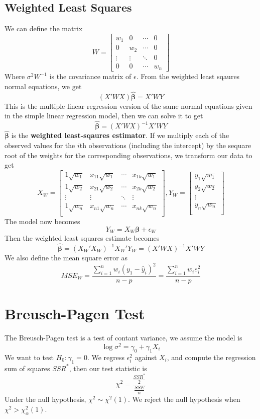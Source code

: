 \subsection{Weighted Least Squares}
We can define the matrix 
\[W = \begin{bmatrix}
    w_1 & 0 & \cdots & 0 \\
    0 & w_2 & \cdots & 0\\
    \vdots & \vdots & \ddots & 0\\
    0 & 0 & \cdots & w_n
\end{bmatrix}\]
Where $\sigma^2W^{-1}$ is the covariance matrix of $\epsilon$. From the weighted least sqaures normal equations, we get 
\[(X'WX)\boldsymbol{\hat{\beta}} = X'WY\]
This is the multiple linear regression version of the same normal equations given in the simple linear regression model, then we can solve it to get 
\[\boldsymbol{\hat{\beta}} = (X'WX)^{-1}X'WY\]
$\boldsymbol{\hat{\beta}}$ is the \textbf{weighted least-sqaures estimator}. If we multiply each of the observed values for the $i$th observations (including the intercept) by the sequare root of the weights for the corresponding observations, we transform our data to get
\renewcommand{\arraystretch}{1.5}
\[X_W = \begin{bmatrix}
    1\sqrt{w_1} & x_{11}\sqrt{w_1} & \cdots & x_{1k}\sqrt{w_1}\\
    1\sqrt{w_2} & x_{21}\sqrt{w_2} & \cdots & x_{2k}\sqrt{w_2}\\
    \vdots & \vdots & \ddots & \vdots\\
    1\sqrt{w_n} & x_{n1}\sqrt{w_n} & \cdots & x_{nk}\sqrt{w_n}\\
\end{bmatrix}, Y_W = \begin{bmatrix}
    y_1\sqrt{w_1}\\
    y_2\sqrt{w_2}\\
    \vdots\\
    y_n\sqrt{w_n}\\
\end{bmatrix}\]
The model now becomes 
\[Y_W = X_W\boldsymbol{\beta} + \epsilon_W\]
Then the weighted least squares estimate becomes 
\[\boldsymbol{\hat{\beta}} = (X_W'X_W)^{-1}X_W'Y_W = (X'WX)^{-1}X'WY\]
We also define the mean square error as 
\[MSE_W = \frac{\sum_{i=1}^n w_i(y_1 - \hat{y}_i)^2}{n-p} = \frac{\sum_{i=1}^nw_ie_i^2}{n-p}\]

\section{Breusch-Pagen Test}

The Breusch-Pagen test is a test of contant variance, we assume the model is 
\[\log \sigma^2 = \gamma_0 + \gamma_1X_i\]
We want to test $H_0: \gamma_1 = 0$. We regress $\epsilon_i^2$ against $X_i$, and compute the regression sum of squares $SSR^*$, then our test statistic is 
\[\chi^2 = \frac{\frac{SSR^*}{2}}{\frac{SSE}{n}}\]
Under the null hypothesis, $\chi^2 \sim \chi^2(1)$. We reject the null hypothesis when $\chi^2 > \chi^2_{\alpha}(1)$.
